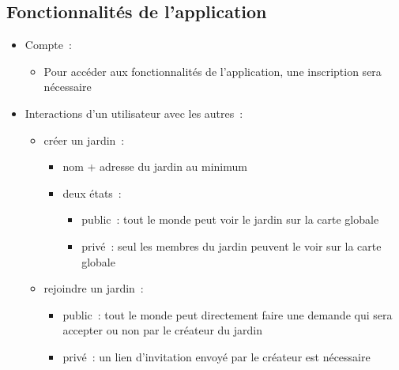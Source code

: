\documentclass[french,a4paper]{article}
\begin{document}
\subsection{Fonctionnalités de l'application}
\begin{itemize}
    \item Compte~:
          \begin{itemize}
              \item Pour accéder aux fonctionnalités de l’application, une inscription sera nécessaire
          \end{itemize}
    \item Interactions d’un utilisateur avec les autres~:
          \begin{itemize}
              \item créer un jardin~:
                    \begin{itemize}
                        \item nom + adresse du jardin au minimum
                        \item deux états~:
                              \begin{itemize}
                                  \item public~: tout le monde peut voir le jardin sur la carte globale
                                  \item privé~: seul les membres du jardin peuvent le voir sur la carte globale
                              \end{itemize}
                    \end{itemize}
              \item rejoindre un jardin~:
                    \begin{itemize}
                        \item public~: tout le monde peut directement faire une demande qui sera accepter ou non par le créateur du jardin
                        \item privé~: un lien d’invitation envoyé par le créateur est nécessaire
                    \end{itemize}


\end{itemize}
\end{itemize}
\end{document}
